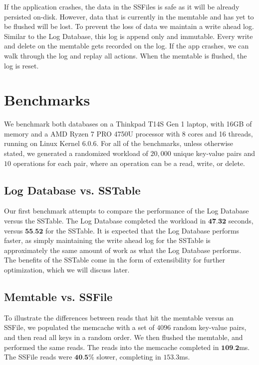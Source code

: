 \documentclass[10pt]{extarticle}
\begin{document}
If the application crashes, the data in the SSFiles is safe as it will be already persisted on-disk. However, data that is currently in the memtable and has yet to be flushed will be lost. To prevent the loss of data we maintain a write ahead log. Similar to the Log Database, this log is append only and immutable. Every write and delete on the memtable gets recorded on the log. If the app crashes, we can walk through the log and replay all actions. When the memtable is flushed, the log is reset.

\section{Benchmarks}

We benchmark both databases on a Thinkpad T14S Gen 1 laptop, with 16GB of memory and a AMD Ryzen 7 PRO 4750U processor with 8 cores and 16 threads, running on Linux Kernel 6.0.6. For all of the benchmarks, unless otherwise stated, we generated a randomized workload of $20,000$ unique key-value pairs and $10$ operations for each pair, where an operation can be a read, write, or delete.

\subsection{Log Database vs. SSTable}


Our first benchmark attempts to compare the performance of the Log Database versus the SSTable. The Log Database completed the workload in $\textbf{47.32}$ seconds, versus $\textbf{55.52}$ for the SSTable. It is expected that the Log Database performs faster, as simply maintaining the write ahead log for the SSTable is approximately the same amount of work as what the Log Database performs. The benefits of the SSTable come in the form of extensibility for further optimization, which we will discuss later. 

\subsection{Memtable vs. SSFile}

To illustrate the differences between reads that hit the memtable versus an SSFile, we populated the memcache with a set of $4096$ random key-value pairs, and then read all keys in a random order. We then flushed the memtable, and performed the same reads. The reads into the memcache completed in $\textbf{109.2}$ms. The SSFile reads were $\textbf{40.5\%}$ slower, completing in $\mathbf{153.3}$ms.
\end{document}
